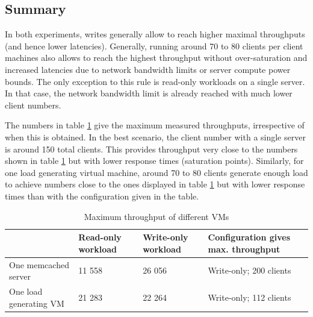 \documentclass[11pt,a4paper]{article}
\begin{document}
\subsection{Summary}
In both experiments, writes generally allow to reach higher maximal throughputs (and hence lower latencies). Generally, running around 70 to 80 clients per client machines also allows to reach the highest throughput without over-saturation and increased latencies due to network bandwidth limits or server compute power bounds. The only exception to this rule is read-only workloads on a single server. In that case, the network bandwidth limit is already reached with much lower client numbers.

The numbers in table \ref{table::max_through_section_2} give the maximum measured throughputs, irrespective of when this is obtained. In the best scenario, the client number with a single server is around 150 total clients. This provides throughput very close to the numbers shown in table \ref{table::max_through_section_2} but with lower response times (saturation points). Similarly, for one load generating virtual machine, around 70 to 80 clients generate enough load to achieve numbers close to the ones displayed in table \ref{table::max_through_section_2} but with lower response times than with the configuration given in the table.

\begin{table}[!h]
    \centering
    \begin{tabular}{|l|p{2cm}|p{2cm}|p{4cm}|}
        \hline                        & Read-only workload & Write-only workload & Configuration gives max. throughput \\
        \hline One memcached server   &             11 558 &              26 056 &             Write-only; 200 clients \\
        \hline One load generating VM &             21 283 &              22 264 &             Write-only; 112 clients \\
        \hline
    \end{tabular}
    \caption{Maximum throughput of different VMs}
    \label{table::max_through_section_2}
\end{table}



\newpage
\end{document}

